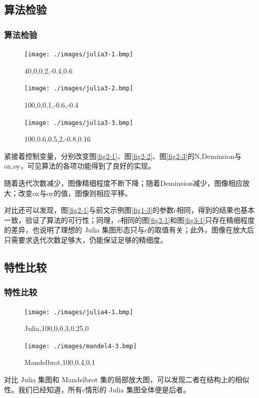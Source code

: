 \documentclass[8pt,c,compress,UTF8]{ctexbeamer}
\begin{document}
\subsection{算法检验}
\begin{frame} 
\frametitle{算法检验}

\begin{figure}[htbp]
\centering
\begin{minipage}{0.33\linewidth}
\centering
\texttt{[image: ./images/julia3-1.bmp]}
\caption{40,0,0,2,-0.4,0.6}
\label{fig3-1}
\end{minipage}\hfill
\begin{minipage}{0.33\linewidth}
\centering
\texttt{[image: ./images/julia3-2.bmp]}
\caption{100,0,0,1,-0.6,-0.4}
\label{fig3-2}
\end{minipage}\hfill
\begin{minipage}{0.33\linewidth}
\centering
\texttt{[image: ./images/julia3-3.bmp]}
\caption{100,0.6,0.5,2,-0.8,0.16}
\label{fig3-3}
\end{minipage}
\end{figure}
紧接着控制变量，分别改变图\ref{fig2-1}、图\ref{fig2-2}、图\ref{fig2-3}的N,Deminsion与ox,oy，可见算法的各项功能得到了良好的实现。

随着迭代次数减少，图像精细程度不断下降；随着Deminsion减少，图像相应放大；改变ox与oy的值，图像则相应平移。

对比还可以发现，图\ref{fig2-1}与前文示例图\ref{fig1-3}的参数$c$相同，得到的结果也基本一致，验证了算法的可行性；同理，$c$相同的图\ref{fig2-1}和图\ref{fig3-1}只存在精细程度的差异，也说明了理想的 Julia 集图形态只与$c$的取值有关；此外，图像在放大后只需要求迭代次数足够大，仍能保证足够的精细度。
\end{frame}

\subsection{特性比较}
\begin{frame} 
\frametitle{特性比较}

\begin{figure}[htb]
\centering
\begin{minipage}{0.45\linewidth}
\centering
\texttt{[image: ./images/julia4-1.bmp]}
\caption*{Julia,100,0,0,3,0.25,0}
\label{fig4-1}
\end{minipage}\hfill
\begin{minipage}{0.45\linewidth}
\centering
\texttt{[image: ./images/mandel4-3.bmp]}
\caption*{Mandelbrot,100,0.4,0,1}
\label{fig4-2}
\end{minipage}
\end{figure}
对比 Julia 集图和 Mandelbrot 集的局部放大图，可以发现二者在结构上的相似性。我们已经知道，所有$c$情形的 Julia 集图全体便是后者。
\end{frame}
\end{document}
